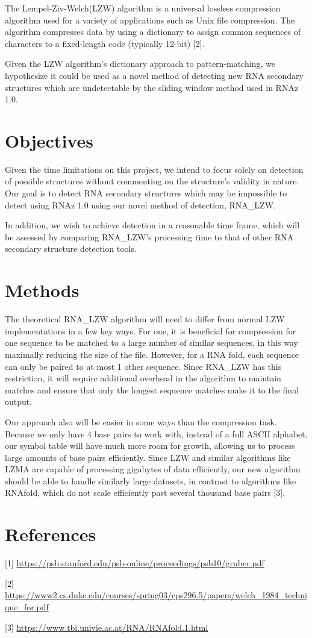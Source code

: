 \documentclass[letterpaper, 12pt]{artikel3}
\begin{document}
The Lempel-Ziv-Welch(LZW) algorithm is a universal lossless compression algorithm used for a variety of applications such as Unix file compression. The algorithm compresses data by using a dictionary to assign common sequences of characters to a fixed-length code (typically 12-bit) [2].

Given the LZW algorithm's dictionary approach to pattern-matching, we hypothesize it could be used as a novel method of detecting new RNA secondary structures which are undetectable by the sliding window method used in RNAz 1.0. 

\vspace{-10mm}
\section*{Objectives}
Given the time limitations on this project, we intend to focus solely on detection of possible structures without commenting on the structure's validity in nature.  Our goal is to detect RNA secondary structures which may be impossible to detect using RNAz 1.0 using our novel method of detection, RNA\_LZW. 

In addition, we wish to achieve detection in a reasonable time frame, which will be assessed by comparing RNA\_LZW's processing time to that of other RNA secondary structure detection tools. 

\vspace{-10mm}
\section*{Methods}

The theoretical RNA\_LZW algorithm will need to differ from normal LZW implementations in a few key ways. For one, it is beneficial for compression for one sequence to be matched to a large number of similar sequences, in this way maximally reducing the size of the file. However, for a RNA fold, each sequence can only be paired to at most 1 other sequence. Since RNA\_LZW has this restriction, it will require additional overhead in the algorithm to maintain matches and ensure that only the longest sequence matches make it to the final output. 

Our approach also will be easier in some ways than the compression task. Because we only have 4 base pairs to work with, instead of a full ASCII alphabet, our symbol table will have much more room for growth, allowing us to process large amounts of base pairs efficiently. Since LZW and similar algorithms like LZMA are capable of processing gigabytes of data efficiently, our new algorithm should be able to handle similarly large datasets, in contrast to algorithms like RNAfold, which do not scale efficiently past several thousand base pairs [3].

\section*{References}

[1] \url{https://psb.stanford.edu/psb-online/proceedings/psb10/gruber.pdf}

[2] \url{https://www2.cs.duke.edu/courses/spring03/cps296.5/papers/welch_1984_technique_for.pdf}

[3] \url{https://www.tbi.univie.ac.at/RNA/RNAfold.1.html}
\end{document}
